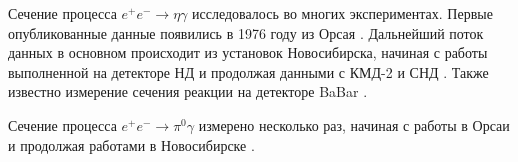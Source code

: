 Сечение процесса $e^+e^-\to\eta\gamma$ исследовалось во многих экспериментах.
Первые опубликованные данные появились в 1976 году из Орсая \cite{Cosme:1975rs}.
Дальнейший поток данных в основном происходит из установок Новосибирска, начиная с работы выполненной на детекторе НД \cite{Druzhinin:1984zq} и продолжая данными с КМД-2 \cite{Akhmetshin:1995vz, Akhmetshin:1999zv, Akhmetshin:2001hm, Akhmetshin:2004gw} и СНД \cite{Achasov:1997nq, Achasov:2000zd, Achasov:2006dv, Achasov:2013eli}.
Также известно измерение сечения реакции на детекторе BaBar \cite{Aubert:2006cy}.

Сечение процесса $e^+e^-\to\pi^0\gamma$ измерено несколько раз, начиная с работы в Орсаи \cite{Cosme:1975rs} и продолжая работами в Новосибирске \cite{Druzhinin:1984zq, Achasov:2000zd, Achasov:2003ed, Akhmetshin:2004gw, Achasov:2016bfr}.
